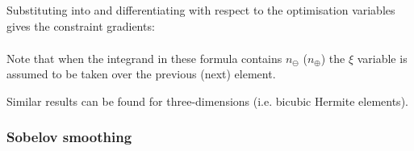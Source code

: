 Substituting  into
 and differentiating with respect to the optimisation
variables gives the constraint gradients:
\begin{eqnarray}
   \label{eqn:arclenjacline}
\end{eqnarray}

Note that when the integrand in these formula contains $n_{\ominus}$
($n_{\oplus}$) the $\xi$ variable is assumed to be taken over the previous
(next) element.

Similar results can be found for three-dimensions (i.e. bicubic Hermite
elements).

\subsubsection{Sobelov smoothing}

